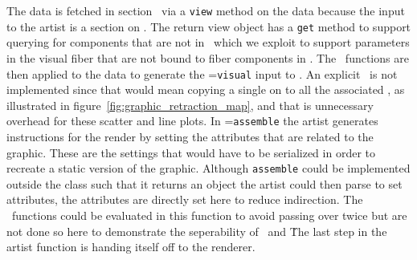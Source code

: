 \documentclass[../main.tex]{subfiles}
\begin{document}
The data is fetched in section \dsection\ via a \texttt{view} method on the data because the input to the artist is a section on \dtotal. The return view object has a \texttt{get} method to support querying for components that are not in \dfiber\, which we exploit to support parameters in the visual fiber that are not bound to fiber components in \dfiber. The \vchannel\ functions are then applied to the data to generate the \vsection=\texttt{visual} input to \vmark. An explicit \vindex\ is not implemented since that would mean copying a single \vsection on \dbasepoint to all the associated \gbasepoint, as illustrated in figure~\ref{fig:graphic_retraction_map}, and that is unnecessary overhead for these scatter and line plots. In \vmarkd=\texttt{assemble} the artist generates instructions for the render by setting  the attributes that are related to the graphic. These are the settings that would have to be serialized in order to recreate a static version of the graphic. Although \texttt{assemble} could be implemented outside the class such that it returns an object the artist could then parse to set attributes, the attributes are directly set here to reduce indirection. The \vchannel\ functions could be evaluated in this function to avoid passing over \dbase twice but are not done so here to demonstrate the seperability of \vchannel\ and \vmarkd\. The last step in the artist function is handing itself off to the renderer. 
\end{document}
